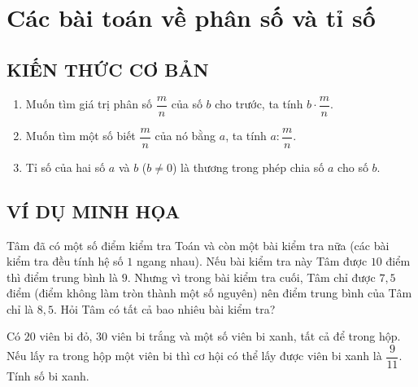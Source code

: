 
\section{Các bài toán về phân số và tỉ số}
\subsection{KIẾN THỨC CƠ BẢN}
\begin{enumerate}
	\item Muốn tìm giá trị phân số $ \dfrac{m}{n} $ của số $ b $ cho trước, ta tính $ b \cdot \dfrac{m}{n} $.
	\item Muốn tìm một số biết $ \dfrac{m}{n} $ của nó bằng $ a $, ta tính $ a : \dfrac{m}{n} $.
	\item Tỉ số của hai số $ a $ và $ b $ ($ b \ne 0 $) là thương trong phép chia số $ a $ cho số $ b $.
\end{enumerate}
\subsection{VÍ DỤ MINH HỌA}

\begin{vd}%
	Tâm đã có một số điểm kiểm tra Toán và còn một bài kiểm tra nữa (các bài kiểm tra đều tính hệ số $ 1 $ ngang nhau). Nếu bài kiểm tra này Tâm được $ 10 $ điểm thì điểm trung bình là $ 9 $. Nhưng vì trong bài kiểm tra cuối, Tâm chỉ được $ 7,5 $ điểm (điểm không làm tròn thành một số nguyên) nên điểm trung bình của Tâm chỉ là $ 8,5 $. Hỏi Tâm có tất cả bao nhiêu bài kiểm tra?
	
\end{vd}

\begin{vd}%
	Có $ 20$ viên bi đỏ, $ 30 $ viên bi trắng và một số viên bi xanh, tất cả để trong hộp. Nếu lấy ra trong hộp một viên bi thì cơ hội có thể lấy được viên bi xanh là $ \dfrac{9}{11} $. Tính số bi xanh.
	
\end{vd}

